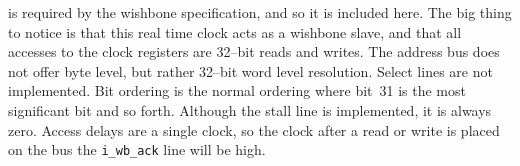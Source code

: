 \documentclass{gqtekspec}
\begin{document}
is required by the wishbone specification, and so 
it is included here.  The big thing to notice is that this real time clock
acts as a wishbone slave, and that all accesses to the
clock registers are 32--bit reads and writes.  The address bus does not offer
byte level, but rather 32--bit word level resolution.  Select lines are not
implemented.  Bit ordering is the normal ordering where bit~31 is the most
significant bit and so forth.  Although the stall line is implemented, it is
always zero.  Access delays are a single clock, so the clock after a read or
write is placed on the bus the {\tt i\_wb\_ack} line will be high.

\iffalse
\chapter{Clocks}\label{chap:clocks}

This core is based upon the Basys--3 design.  The Basys--3 development board
contains one external 100~MHz clock, which is sufficient to run this
core.  The logic within the core can also be run faster, or slower, as is
necessary to meet the timing constraints associated with the internal
operations of the core and it's surrounding environment.  See
Table.~\ref{tbl:clocks}.
\begin{table}[htbp]
\begin{center}
\begin{clocklist}
i\_clk & External & 250~THz & 66~kHz & System clock.\\\hline
\end{clocklist}
\caption{List of Clocks}\label{tbl:clocks}
\end{center}\end{table}

\fi
\end{document}
